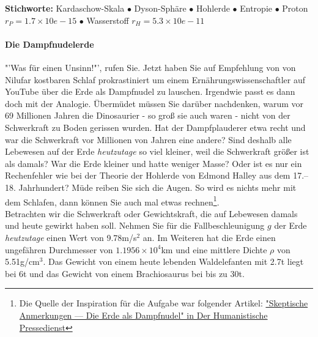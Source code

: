 \documentclass[a4paper, 9pt]{scrartcl}\usepackage[]{graphicx}\usepackage[]{xcolor}
\begin{document}
{\tiny\textbf{Stichworte:} Kardaschow-Skala $\bullet$ Dyson-Sphäre $\bullet$ Hohlerde $\bullet$ Entropie $\bullet$ Proton $r_P = 1.7 \times 10e-15$ $\bullet$ Wasserstoff $r_H = 5.3\times 10e-11$}

\ifcollection
\paragraph{Die Dampfnudelerde}
\fi



"'Was für einen Unsinn!"', rufen Sie. Jetzt haben Sie auf Empfehlung von von Nilufar kostbaren Schlaf prokrastiniert um einem Ernährungswissenschaftler auf YouTube über die Erde als Dampfnudel zu lauschen. Irgendwie passt es dann doch mit der Analogie. Übermüdet müssen Sie darüber nachdenken, warum vor 69 Millionen Jahren die Dinosaurier - so groß sie auch waren - nicht von der Schwerkraft zu Boden gerissen wurden. Hat der Dampfplauderer etwa recht und war die Schwerkraft vor Millionen von Jahren eine andere?  Sind deshalb alle Lebewesen auf der Erde \textit{heutzutage} so viel kleiner, weil die Schwerkraft größer ist als damals? War die Erde kleiner und hatte weniger Masse? Oder ist es nur ein Rechenfehler wie bei der Theorie der Hohlerde von Edmond Halley aus dem 17.–18. Jahrhundert? Müde reiben Sie sich die Augen. So wird es nichts mehr mit dem Schlafen, dann können Sie auch mal etwas rechnen\footnote{Die Quelle der Inspiration
  für die Aufgabe war folgender Artikel:
  \href{https://hpd.de/artikel/erde-dampfnudel-22236}{"Skeptische Anmerkungen --- Die Erde als Dampfnudel" in Der Humanistische Pressedienst}}.  \\

Betrachten wir die Schwerkraft oder Gewichtskraft, die auf Lebewesen damals und heute gewirkt haben soll. Nehmen Sie für die Fallbeschleunigung $g$ der Erde \textit{heutzutage} einen Wert von 9.78m/s$^2$ an. Im Weiteren hat die Erde einen ungefähren Durchmesser von \ensuremath{1.1956\times 10^{4}}km und eine mittlere Dichte $\rho$ von 5.51g/cm$^3$. Das Gewicht von einem heute lebenden Waldelefanten mit 2.7t liegt bei 6t und das Gewicht von einem Brachiosaurus bei bis zu 30t.
\end{document}
